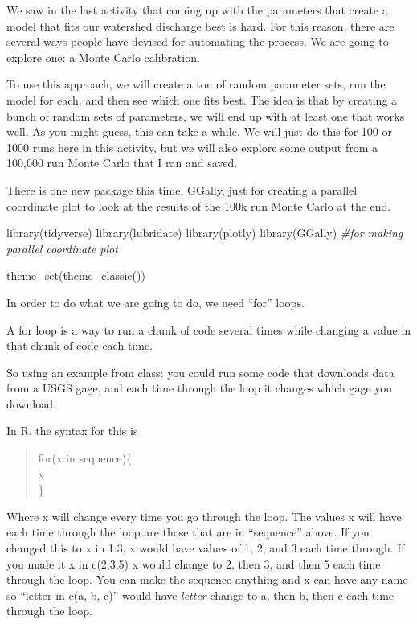 \documentclass[
]{book}
\newenvironment{Shaded}{\begin{snugshade}}{\end{snugshade}}
\newcommand{\CommentTok}[1]{\textcolor[rgb]{0.56,0.35,0.01}{\textit{#1}}}
\newcommand{\FunctionTok}[1]{\textcolor[rgb]{0.00,0.00,0.00}{#1}}
\newcommand{\NormalTok}[1]{#1}
\begin{document}
We saw in the last activity that coming up with the parameters that create a model that fits our watershed discharge best is hard. For this reason, there are several ways people have devised for automating the process. We are going to explore one: a Monte Carlo calibration.

To use this approach, we will create a ton of random parameter sets, run the model for each, and then see which one fits best. The idea is that by creating a bunch of random sets of parameters, we will end up with at least one that works well. As you might guess, this can take a while. We will just do this for 100 or 1000 runs here in this activity, but we will also explore some output from a 100,000 run Monte Carlo that I ran and saved.

There is one new package this time, GGally, just for creating a parallel coordinate plot to look at the results of the 100k run Monte Carlo at the end.

\begin{Shaded}
\begin{Highlighting}[]
\FunctionTok{library}\NormalTok{(tidyverse)}
\FunctionTok{library}\NormalTok{(lubridate)}
\FunctionTok{library}\NormalTok{(plotly)}
\FunctionTok{library}\NormalTok{(GGally) }\CommentTok{\#for making parallel coordinate plot}

\FunctionTok{theme\_set}\NormalTok{(}\FunctionTok{theme\_classic}\NormalTok{())}
\end{Highlighting}
\end{Shaded}

In order to do what we are going to do, we need ``for'' loops.

A for loop is a way to run a chunk of code several times while changing a value in that chunk of code each time.

So using an example from class: you could run some code that downloads data from a USGS gage, and each time through the loop it changes which gage you download.

In R, the syntax for this is

\begin{quote}
for(x in sequence)\{\\
x\\
\}\\
\end{quote}

Where x will change every time you go through the loop. The values x will have each time through the loop are those that are in ``sequence'' above. If you changed this to x in 1:3, x would have values of 1, 2, and 3 each time through. If you made it x in c(2,3,5) x would change to 2, then 3, and then 5 each time through the loop. You can make the sequence anything and x can have any name so ``letter in c(a, b, c)'' would have \emph{letter} change to a, then b, then c each time through the loop.
\end{document}
